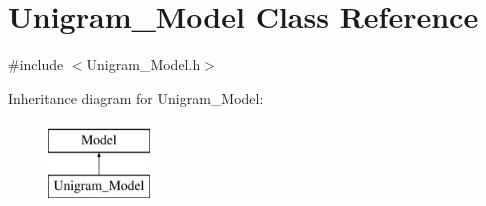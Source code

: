 \hypertarget{class_unigram___model}{
\section{Unigram\_\-Model Class Reference}
\label{class_unigram___model}
}


{\ttfamily \#include $<$Unigram\_\-Model.h$>$}

Inheritance diagram for Unigram\_\-Model:\begin{figure}[H]
\begin{center}
\leavevmode
\includegraphics[height=2cm]{class_unigram___model}
\end{center}
\end{figure}
